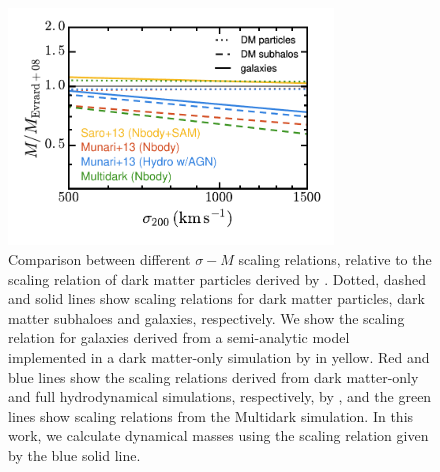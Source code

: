 \begin{figure}
 \centerline{\includegraphics[width=3.4in]{chapter3/scalings-literature_ratios.pdf}}
\caption{Comparison between different $\sigma-M$ scaling relations, relative to the scaling 
relation of dark matter particles derived by \citet{evrard08}. Dotted, dashed and solid lines show 
scaling relations for dark matter particles, dark matter subhaloes and galaxies, respectively. We 
show the scaling relation for galaxies derived from a semi-analytic model implemented in a dark 
matter-only simulation by \citet{saro13} in yellow. Red and blue lines show the scaling relations 
derived from dark matter-only and full hydrodynamical simulations, respectively, by 
\citet{munari13}, and the green lines show scaling relations from the Multidark simulation. In 
this work, we calculate dynamical masses using the scaling relation given by the blue solid line.}
\label{f:scalings_simulations}
\end{figure}
 

